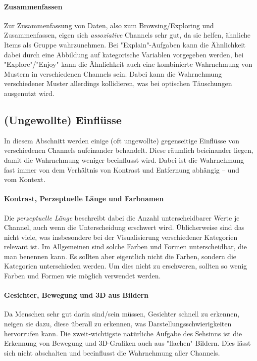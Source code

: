 			\paragraph{Zusammenfassen}
				Zur Zusammenfassung von Daten, also zum Browsing/Exploring und Zusammenfassen, eigen sich \emph{assoziative} Channels sehr gut, da sie helfen, ähnliche Items als Gruppe wahrzunehmen. Bei "Explain"-Aufgaben kann die Ähnlichkeit dabei durch eine Abbildung auf kategorische Variablen vorgegeben werden, bei "Explore"/"Enjoy" kann die Ähnlichkeit auch eine kombinierte Wahrnehmung von Mustern in verschiedenen Channels sein. Dabei kann die Wahrnehmung verschiedener Muster allerdings kollidieren, was bei optischen Täuschungen ausgenutzt wird.

		\subsection{(Ungewollte) Einflüsse}
			In diesem Abschnitt werden einige (oft ungewollte) gegenseitige Einflüsse von verschiedenen Channels aufeinander behandelt. Diese räumlich beieinander liegen, damit die Wahrnehmung weniger beeinflusst wird. Dabei ist die Wahrnehmung fast immer von dem Verhältnis von Kontrast und Entfernung abhängig -- und vom Kontext.

			\paragraph{Kontrast, Perzeptuelle Länge und Farbnamen}
				Die \emph{perzeptuelle Länge} beschreibt dabei die Anzahl unterscheidbarer Werte je Channel, auch wenn die Unterscheidung erschwert wird. Üblicherweise sind das nicht viele, was insbesondere bei der Visualisierung verschiedener Kategorien relevant ist. Im Allgemeinen sind solche Farben und Formen unterscheidbar, die man benennen kann. Es sollten aber eigentlich nicht die Farben, sondern die Kategorien unterschieden werden. Um dies nicht zu erschweren, sollten so wenig Farben und Formen wie möglich verwendet werden.

			\paragraph{Gesichter, Bewegung und 3D aus Bildern}
				Da Menschen sehr gut darin sind/sein müssen, Gesichter schnell zu erkennen, neigen sie dazu, diese überall zu erkennen, was Darstellungsschwierigkeiten hervorrufen kann. Die zweit-wichtigste natürliche Aufgabe des Sehsinns ist die Erkennung von Bewegung und 3D-Grafiken auch aus "flachen" Bildern. Dies lässt sich nicht abschalten und beeinflusst die Wahrnehmung aller Channels.

